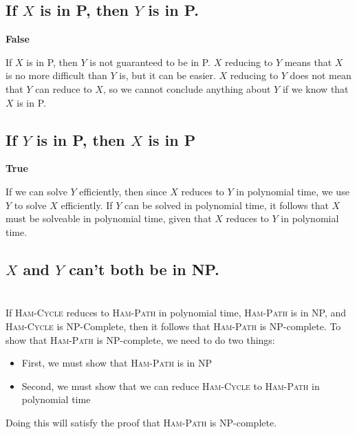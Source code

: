\documentclass{article}
\begin{document}
\subsection{If $X$ is in P, then $Y$ is in P.}

\textbf{False}

If $X$ is in P, then $Y$ is not guaranteed to be in P.  $X$ reducing to $Y$ means that $X$ is no more difficult than $Y$ is, but it can be easier.  $X$ reducing to $Y$ does not mean that $Y$ can reduce to $X$, so we cannot conclude anything about $Y$ if we know that $X$ is in P.

\subsection{If $Y$ is in P, then $X$ is in P}

\textbf{True}

If we can solve $Y$ efficiently, then since $X$ reduces to $Y$ in polynomial time, we use $Y$ to solve $X$ efficiently.  If $Y$ can be solved in polynomial time, it follows that $X$ must be solveable in polynomial time, given that $X$ reduces to $Y$ in polynomial time.

\subsection{$X$ and $Y$ can't both be in NP.}

\section{}

If \textsc{Ham-Cycle} reduces to \textsc{Ham-Path} in polynomial time, \textsc{Ham-Path} is in NP, and \textsc{Ham-Cycle} is NP-Complete, then it follows that \textsc{Ham-Path} is NP-complete.  To show that \textsc{Ham-Path} is NP-complete, we need to do two things:

\begin{itemize}
    \item First, we must show that \textsc{Ham-Path} is in NP
    \item Second, we must show that we can reduce \textsc{Ham-Cycle} to \textsc{Ham-Path} in polynomial time
\end{itemize}

Doing this will satisfy the proof that \textsc{Ham-Path} is NP-complete.

\subsection{}
\end{document}
